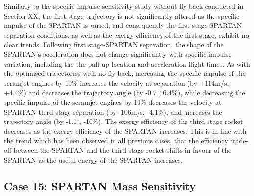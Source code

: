 Similarly to the specific impulse sensitivity study without fly-back conducted in Section XX, the first stage trajectory is not significantly altered as the specific impulse of the SPARTAN is varied, and consequently the first stage-SPARTAN separation conditions, as well as the exergy efficiency of the first stage, exhibit no clear trends. Following first stage-SPARTAN separation, the shape of the SPARTAN's acceleration does not change significantly with specific impulse variation, including the the pull-up location and acceleration flight times. As with the optimised trajectories with no fly-back, increasing the specific impulse of the scramjet engines by 10\% increases the velocity at separation (by +114m/s, +4.4\%) and decreases the trajectory angle (by -0.7$^\circ$, 6.4\%), while decreasing the specific impulse of the scramjet engines by 10\% decreases the velocity at SPARTAN-third stage separation (by -106m/s, -4.1\%), and increases the trajectory angle (by -1.1$^\circ$, -10\%).
The exergy efficiency of the third stage rocket decreases as the exergy efficiency of the SPARTAN increases. This is in line with the trend which has been observed in all previous cases, that the efficiency trade-off between the SPARTAN and the third stage rocket shifts in favour of the SPARTAN as the useful energy of the SPARTAN increases. 






\subsection{Case 15: SPARTAN Mass Sensitivity}\label{sec:m2var}


